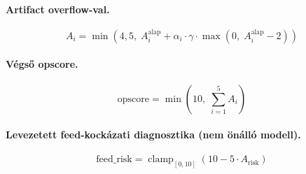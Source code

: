 \paragraph{Artifact overflow-val.}
\begin{equation}
A_i = \min\!\left(4{,}5,\; A_i^{\text{alap}} + \alpha_i \cdot \gamma \cdot \max\!\left(0,\; A_i^{\text{alap}} - 2\right)\right)
\end{equation}

\paragraph{Végső opscore.}
\begin{equation}
\text{opscore} = \min\!\left(10,\; \sum_{i=1}^{5} A_i\right)
\end{equation}

\paragraph{Levezetett feed-kockázati diagnosztika (nem önálló modell).}
\begin{equation}
\text{feed\_risk} = \operatorname{clamp}_{[0,10]}\!\left(10 - 5 \cdot A_{\text{risk}}\right)
\end{equation}
